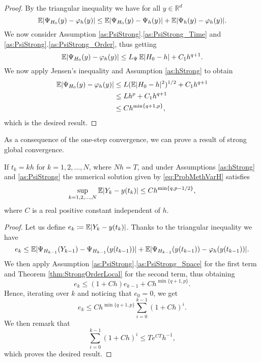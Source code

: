 \documentclass{siamart1116}
\numberwithin{theorem}{section}
\DeclarePairedDelimiter{\abs}{\lvert}{\rvert}
\renewcommand{\phi}{\varphi}
\newcommand{\R}{\mathbb{R}}
\newcommand{\defeq}{\coloneqq}
\newcommand{\E}{\operatorname{\mathbb{E}}}
\newcommand{\sksum}{\textstyle\sum}
\begin{document}
\begin{proof} By the triangular inequality we have for all $y \in \R^d$ 
	\begin{equation}
		\E\abs{\Psi_{H_0}(y) - \phi_h(y)} \leq \E\abs{\Psi_{H_0}(y) - \Psi_h(y)} + \E\abs{\Psi_h(y) - \phi_h(y)}.
	\end{equation}		
	We now consider Assumption \ref{as:PsiStrong}.\ref{as:PsiStrong_Time} and \ref{as:PsiStrong}.\ref{as:PsiStrong_Order}, thus getting
	\begin{equation}
		\E\abs{\Psi_{H_0}(y) - \phi_h(y)} \leq L_{\Psi} \E\abs{H_0 - h} + C_1 h^{q+1}.
	\end{equation}
	We now apply Jensen's inequality and Assumption \ref{as:hStrong} to obtain
	\begin{equation}
	\begin{aligned}
		\E\abs{\Psi_{H_0}(y) - \phi_h(y)} & \leq L (\E\abs{H_0 - h}^{2})^{1/2} + C_1 h^{q+1}\\
		&\leq L h^p + C_1 h^{q+1} \\
		&\leq C h^{\min\{q+1, p\}},
	\end{aligned}
	\end{equation}
	which is the desired result.
\end{proof}
As a consequence of the one-step convergence, we can prove a result of strong global convergence.
\begin{theorem}\label{thm:StrongOrder} If $t_k = kh$ for $k = 1, 2, \ldots, N$, where $Nh = T$, and under Assumptions \ref{as:hStrong} and \ref{as:PsiStrong} the numerical solution given by \eqref{eq:ProbMethVarH} satisfies 
	\begin{equation}\label{eq:StrongGlobalClaim}
		\sup_{k=1,2, \ldots, N} \E\abs{Y_k - y(t_k)} \leq C h^{\min\{q, p-1/2\}},
	\end{equation}
	where $C$ is a real positive constant independent of $h$. 
\end{theorem}
\begin{proof} Let us define $e_k \defeq \E\abs{Y_k - y(t_k)}$. Thanks to the triangular inequality we have
	\begin{equation}
		e_k \leq \E\abs{\Psi_{H_{k-1}}(Y_{k-1}) - \Psi_{H_{k-1}}(y(t_{k-1}))} + \E\abs{\Psi_{H_{k-1}}(y(t_{k-1})) - \phi_{h}(y(t_{k-1}))}.
	\end{equation}
	 We then apply Assumption \ref{as:PsiStrong}.\ref{as:PsiStrong_Space} for the first term and Theorem \ref{thm:StrongOrderLocal} for the second term, thus obtaining
	\begin{equation}
		e_k \leq (1 + Ch) e_{k - 1} + C h^{\min\{q + 1, p\}}.
	\end{equation}
	Hence, iterating over $k$ and noticing that $e_0 = 0$, we get
	\begin{equation}
		e_k \leq C h^{\min\{q + 1, p\}} \sksum_{i=0}^{k-1} (1 + Ch)^i.
	\end{equation}
	We then remark that
	\begin{equation}
		\sksum_{i=0}^{k-1} (1 + Ch)^i \leq Te^{CT}h^{-1},
	\end{equation}
	which proves the desired result.
\end{proof}
\end{document}
